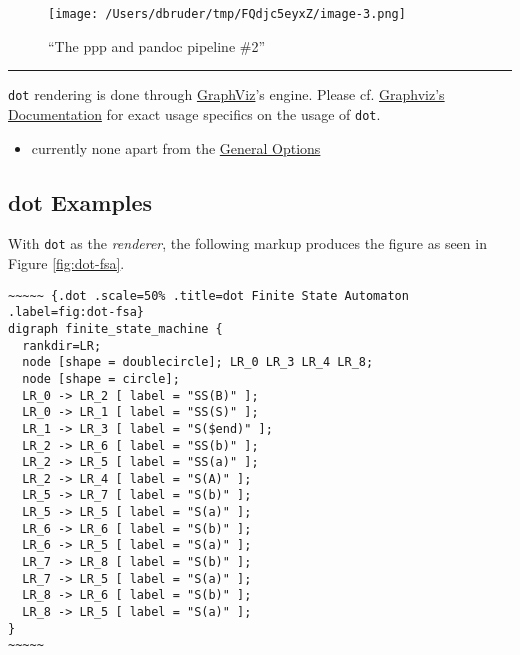 \documentclass[]{article}
\begin{document}
\normalsize

\begin{figure}[htbp]
\centering
\texttt{[image: /Users/dbruder/tmp/FQdjc5eyxZ/image-3.png]}
\caption{``The ppp and pandoc pipeline
\#2''\label{fig:pipeline-overview-2}}
\end{figure}

\begin{center}\rule{3in}{0.4pt}\end{center}

\newpage


\texttt{dot} rendering is done through
\href{http://www.graphviz.org/}{GraphViz}'s engine. Please cf.
\href{http://www.graphviz.org/Documentation.php}{Graphviz's
Documentation} for exact usage specifics on the usage of \texttt{dot}.


\begin{itemize}
\itemsep1pt\parskip0pt
\item
  currently none apart from the \hyperref[general-options]{General
  Options}
\end{itemize}

\subsection{dot Examples}\label{dot-examples}

With \texttt{dot} as the \emph{renderer}, the following markup produces
the figure as seen in Figure \ref{fig:dot-fsa}.

\scriptsize

\begin{verbatim}
~~~~~ {.dot .scale=50% .title=dot Finite State Automaton .label=fig:dot-fsa}
digraph finite_state_machine {
  rankdir=LR;
  node [shape = doublecircle]; LR_0 LR_3 LR_4 LR_8;
  node [shape = circle];
  LR_0 -> LR_2 [ label = "SS(B)" ];
  LR_0 -> LR_1 [ label = "SS(S)" ];
  LR_1 -> LR_3 [ label = "S($end)" ];
  LR_2 -> LR_6 [ label = "SS(b)" ];
  LR_2 -> LR_5 [ label = "SS(a)" ];
  LR_2 -> LR_4 [ label = "S(A)" ];
  LR_5 -> LR_7 [ label = "S(b)" ];
  LR_5 -> LR_5 [ label = "S(a)" ];
  LR_6 -> LR_6 [ label = "S(b)" ];
  LR_6 -> LR_5 [ label = "S(a)" ];
  LR_7 -> LR_8 [ label = "S(b)" ];
  LR_7 -> LR_5 [ label = "S(a)" ];
  LR_8 -> LR_6 [ label = "S(b)" ];
  LR_8 -> LR_5 [ label = "S(a)" ];
}
~~~~~
\end{verbatim}
\end{document}
